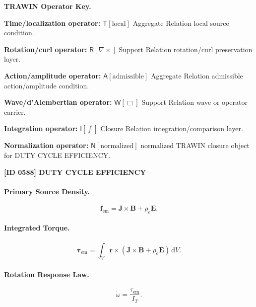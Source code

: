 \par\vspace{0.45\baselineskip}
\noindent\begin{minipage}[t]{\linewidth}
\begingroup
\small
\raggedright
\textbf{TRAWIN Operator Key.}\par
\noindent\textbf{Time/localization operator:} $\mathsf{T}\!\left[\mathrm{local}\right]$ Aggregate Relation local source condition.\par
\noindent\textbf{Rotation/curl operator:} $\mathsf{R}\!\left[\nabla\times\right]$ Support Relation rotation/curl preservation layer.\par
\noindent\textbf{Action/amplitude operator:} $\mathsf{A}\!\left[\mathrm{admissible}\right]$ Aggregate Relation admissible action/amplitude condition.\par
\noindent\textbf{Wave/d'Alembertian operator:} $\mathsf{W}\!\left[\Box\right]$ Support Relation wave or operator carrier.\par
\noindent\textbf{Integration operator:} $\mathsf{I}\!\left[\int\right]$ Closure Relation integration/comparison layer.\par
\noindent\textbf{Normalization operator:} $\mathsf{N}\!\left[\mathrm{normalized}\right]$ normalized TRAWIN closure object for DUTY CYCLE EFFICIENCY.\par
\endgroup
\end{minipage}

\clearpage
\noindent\textbf{[ID 0588] DUTY CYCLE EFFICIENCY}\par
\vspace{0.35em}
\paragraph{Primary Source Density.}
\begin{equation}
\mathbf{f}_{\mathrm{em}}
=
\mathbf{J}\times\mathbf{B}
+
\rho_e\mathbf{E}.
\end{equation}

\paragraph{Integrated Torque.}
\begin{equation}
\boldsymbol{\tau}_{\mathrm{em}}
=
\int_V
\mathbf{r}\times
\left(
\mathbf{J}\times\mathbf{B}
+
\rho_e\mathbf{E}
\right)
\,\mathrm{d}V .
\end{equation}

\paragraph{Rotation Response Law.}
\begin{equation}
\dot{\omega}
=
\frac{\tau_{\mathrm{em}}}{I_T}.
\end{equation}

